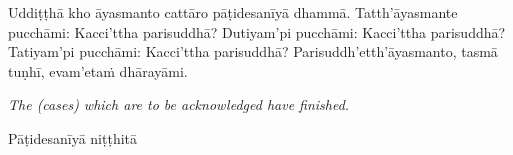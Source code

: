 \documentclass[11pt]{article}
\newcommand{\EnglishColumn}[1]{\itshape\footnotesize{#1}}
\begin{document}
\begin{paracol}{2}
\begin{column}
\begin{flushleft}
Uddiṭṭhā kho āyasmanto cattāro pāṭidesanīyā dhammā.\newline
Tatth’āyasmante pucchāmi: Kacci’ttha parisuddhā?\newline
Dutiyam’pi pucchāmi: Kacci’ttha parisuddhā?\newline
Tatiyam’pi pucchāmi: Kacci’ttha parisuddhā?\newline
Parisuddh’etth’āyasmanto, tasmā tuṇhī, evam’etaṁ dhārayāmi.
\switchcolumn*
\end{flushleft}

{\EnglishColumn
The (cases) which are to be acknowledged have finished.
}
\switchcolumn

\begin{flushleft}
Pāṭidesanīyā niṭṭhitā
\switchcolumn*
\end{flushleft}


\end{column}
\end{paracol}
\end{document}
